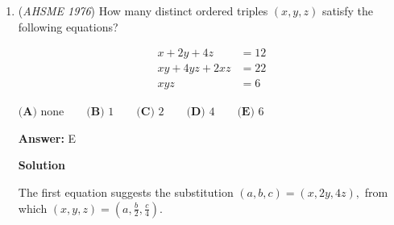 \begin{enumerate}
\textbf{Solution}

This problem is very wordy. Nonetheless, let $a$ and $b$ be Ann and Barbara's current ages, respectively. We are given that $a+b=44$. Let $y$ equal the difference between their ages, so $y=a-b$. Know that $y$ is constant because the difference between their ages will always be the same.

 Now, let's tackle the equation: $b=$ Ann's age when Barbara was Ann's age when Barbara was $\frac{a}{2}$. When Barbara was $\frac{a}{2}$ years old, Ann was $\frac{a}{2}+y$ years old. So the equation becomes $b=$ Ann's age when Barbara was $\frac{a}{2}+y$. Adding on their age difference again, we get $b = \frac{a}{2} + y + y \Rightarrow b = \frac{a}{2} + 2y$. Substitute $a-b$ back in for $y$ to get $b = \frac{a}{2} + 2(a-b)$. Simplify: $2b = a + 4(a-b) \Rightarrow 6b = 5a$. Solving $b$ in terms of $a$, we have $b = \frac{5a}{6}$. Substitute that back into the first equation of $a+b=44$ to get $\frac{11a}{6}=44$. Solve for $a$, and the answer is $\boxed{\textbf{(B) }24}$. ~\href{https://artofproblemsolving.com/wiki/index.php/User:Jiang147369}{jiang147369}

 


	\item (\textit{AHSME 1976}) How many distinct ordered triples $(x,y,z)$ satisfy the following equations?

 \begin{align*} x + 2y + 4z &= 12 \\ xy + 4yz + 2xz &= 22 \\ xyz &= 6 \end{align*}

$\textbf{(A) }\text{none}\qquad \textbf{(B) }1\qquad \textbf{(C) }2\qquad \textbf{(D) }4\qquad \textbf{(E) }6$

 \textbf{Answer: }E



\textbf{Solution}

The first equation suggests the substitution $(a,b,c)=(x,2y,4z),$ from which $(x,y,z)=\left(a,\frac b2,\frac c4\right).$


\end{enumerate}
